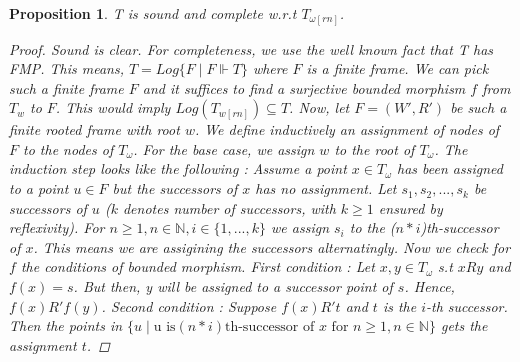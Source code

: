 \documentclass[12pt, a4paper]{scrartcl}
\newtheorem{proposition}[definition]{Proposition}
\begin{document}
\begin{proposition}
    T is sound and complete w.r.t $T_{\omega[rn]}$.

    \begin{proof}
    Sound is clear. For completeness, we use the well known fact that T has FMP. This means, $T = Log\{F \mid F \Vdash T\}$ where $F$ is a finite frame.
    We can pick such a finite frame $F$ and it suffices to find a surjective bounded morphism $f$ from $T_w$ to $F$. This would imply $Log(T_{w[rn]}) \subseteq T$. \newline
    Now, let $F = (W', R')$ be such a finite rooted frame with root $w$. We define 
    inductively an assignment of nodes of $F$ to the nodes of $T_\omega$. For the base case, we assign $w$ to the root of $T_\omega$. The induction step looks like the following : 
    Assume a point $x \in T_\omega$ has been assigned to a point $u \in F$ but the successors of $x$ has no assignment. 
    Let $s_1, s_2, ..., s_k$ be successors of $u$ ($k$ denotes number of successors, with $k \geq 1$ ensured by reflexivity).
    For $n \geq 1, n \in \mathbb{N}, i \in\{1,...,k\}$ we assign $s_i$ to the ($n * i$)th-successor of $x$. This means we are assigining the successors alternatingly. \newline
    Now we check for $f$ the conditions of bounded morphism. First condition : Let $x,y \in T_\omega$ s.t $xRy$ and $f(x) = s$. But then, y will be assigned to a successor point of $s$. 
    Hence, $f(x) R'f(y)$. Second condition : Suppose $f(x)R't$ and $t$ is the $i$-th successor. Then the points in $\{u \mid \text{u is} (n*i)\text{th-successor of }x \text{ for } n\geq 1, n\in \mathbb{N}\}$ gets the assignment $t$.
    
    \end{proof}
        
\end{proposition}
\clearpage
\end{document}

